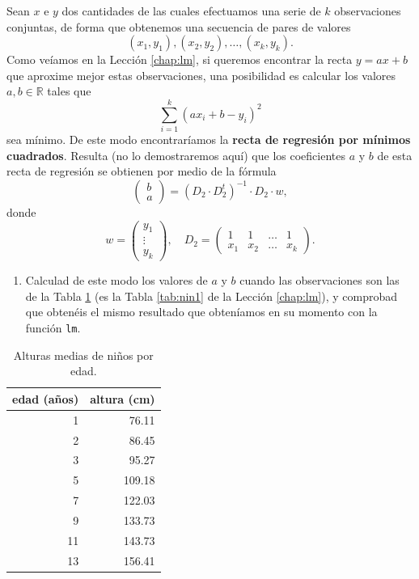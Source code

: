\documentclass[
]{book}
\providecommand{\tightlist}{%
  \setlength{\itemsep}{0pt}\setlength{\parskip}{0pt}}
\theoremstyle{definition}
\theoremstyle{definition}
\theoremstyle{definition}
\theoremstyle{remark}
\begin{document}
Sean \(x\) e \(y\) dos cantidades de las cuales efectuamos una serie de \(k\)
observaciones conjuntas, de forma que obtenemos una secuencia de pares de valores
\[
(x_{1}, y_{1}), (x_{2}, y_{2}), \ldots, (x_{k}, y_{k}).
\]
Como veíamos en la Lección \ref{chap:lm}, si queremos encontrar la recta \(y=ax+b\) que aproxime mejor estas observaciones, una posibilidad es calcular los valores \(a, b\in \mathbb{R}\) tales que
\[
\sum_{i=1}^k (ax_{i}+b-y_{i})^2
\]
sea mínimo. De este modo encontraríamos la \textbf{recta de regresión por mínimos cuadrados}. Resulta (no lo demostraremos aquí) que los coeficientes \(a\) y \(b\) de esta recta de regresión se obtienen por medio de la fórmula
\[
\left(\begin{matrix} b\\ a \end{matrix}
\right)=
(D_{2}\cdot D_{2}^t)^{-1}\cdot D_{2}\cdot w, 
\]
donde
\[
w=\left(\begin{matrix}y_{1}\\ \vdots\\ y_{k}\end{matrix}
\right), \quad
D_{2}=\left(\begin{matrix}
1 & 1 & \ldots & 1 \\
x_{1} & x_{2} & \ldots & x_{k}
\end{matrix}
\right).
\]

\begin{enumerate}
\def\labelenumi{\alph{enumi}.}
\tightlist
\item
  Calculad de este modo los valores de \(a\) y \(b\) cuando las observaciones son las de la Tabla \ref{tab:Ex501} (es la Tabla \ref{tab:nin1} de la Lección \ref{chap:lm}), y comprobad que obtenéis el mismo resultado que obteníamos en su momento con la función \texttt{lm}.
\end{enumerate}

\begin{table}

\caption{\label{tab:Ex501}Alturas medias de niños por edad.}
\centering
\begin{tabular}[t]{r|r}
\hline
edad (años) & altura (cm)\\
\hline
1 & 76.11\\
\hline
2 & 86.45\\
\hline
3 & 95.27\\
\hline
5 & 109.18\\
\hline
7 & 122.03\\
\hline
9 & 133.73\\
\hline
11 & 143.73\\
\hline
13 & 156.41\\
\hline
\end{tabular}
\end{table}
\end{document}
